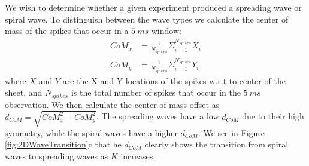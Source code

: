 We wish to determine whether a given experiment produced a spreading wave or spiral wave.
To distinguish between the wave types we calculate the center of mass of the spikes that occur in a $5~ms$ window:
\begin{align}
 CoM_x &= \frac{1}{N_{spikes}}\Sigma_{i=1}^{N_{spikes}} X_i\\
 CoM_y &= \frac{1}{N_{spikes}}\Sigma_{i=1}^{N_{spikes}} Y_i
\end{align}
where $X$ and $Y$ are the X and Y locations of the spikes w.r.t to center of the sheet, and $N_{spikes}$ is the total number of spikes that occur in the $5~ms$ observation.
We then calculate the center of mass offset as $d_{CoM}=\sqrt{CoM_x^2 + CoM_y^2}$.
The spreading waves have a low $d_{CoM}$ due to their high symmetry, while the spiral waves have a higher $d_{CoM}$.
We see in Figure \ref{fig:2DWaveTransition}c that he $d_{CoM}$ clearly shows the transition from spiral waves to spreading waves as $K$ increases.
